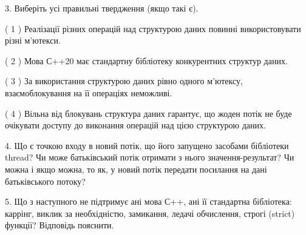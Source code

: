 \documentclass[12pt, ukrainian]{article}
\begin{document}
\begin {large}
{\vspace{5mm}
3. Виберіть усі правильні твердження (якщо такі є).\par
\vspace{2mm}

( 1 ) Реалізації різних операцій над структурою даних повинні використовувати різні м’ютекси.%

( 2 ) Мова С++20 має стандартну бібліотеку конкурентних структур даних.%

( 3 ) За використання структурою даних рівно одного м’ютексу, взаємоблокування на її операціях неможливі.%

( 4 ) Вільна від блокувань структура даних гарантує, що жоден потік не буде очікувати доступу до виконання операцій над цією структурою даних.%


\vspace{5mm}
4. Що є точкою входу в новий потік, що його запущено засобами бібліотеки thread? Чи може батьківський потік отримати з нього значення-результат? Чи можна і якщо можна, то як, у новий потік передати посилання на дані батьківського потоку?



\vspace{5mm}
5. Що з наступного не підтримує ані мова С++, ані її стандартна бібліотека: каррінг, виклик за необхідністю, замикання, ледачі обчислення, строгі (strict) функції? Відповідь пояснити.
}
\end {large}
\end{document}
